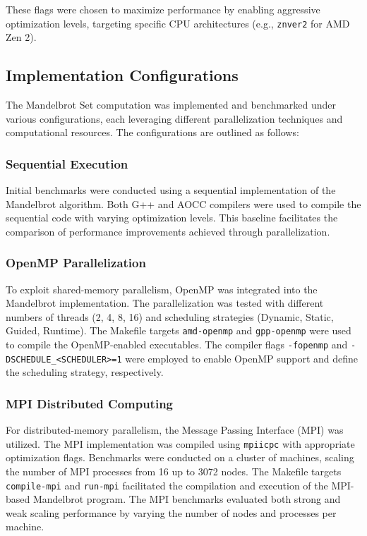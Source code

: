 \documentclass[
	report, %
	11pt, %
]{CSUniSchoolLabReport}
\newcounter{ct}
\begin{document}
These flags were chosen to maximize performance by enabling aggressive optimization levels, targeting specific CPU architectures (e.g., \texttt{znver2} for AMD Zen 2).

\subsection{Implementation Configurations}

The Mandelbrot Set computation was implemented and benchmarked under various configurations, each leveraging different parallelization techniques and computational resources. The configurations are outlined as follows:

\subsubsection{Sequential Execution}

Initial benchmarks were conducted using a sequential implementation of the Mandelbrot algorithm. Both G++ and AOCC compilers were used to compile the sequential code with varying optimization levels. This baseline facilitates the comparison of performance improvements achieved through parallelization.

\subsubsection{OpenMP Parallelization}

To exploit shared-memory parallelism, OpenMP was integrated into the Mandelbrot implementation. The parallelization was tested with different numbers of threads (2, 4, 8, 16) and scheduling strategies (Dynamic, Static, Guided, Runtime). The Makefile targets \texttt{amd-openmp} and \texttt{gpp-openmp} were used to compile the OpenMP-enabled executables. The compiler flags \texttt{-fopenmp} and \texttt{-DSCHEDULE\_<SCHEDULER>=1} were employed to enable OpenMP support and define the scheduling strategy, respectively.

\subsubsection{MPI Distributed Computing}

For distributed-memory parallelism, the Message Passing Interface (MPI) was utilized. The MPI implementation was compiled using \texttt{mpiicpc} with appropriate optimization flags. Benchmarks were conducted on a cluster of machines, scaling the number of MPI processes from 16 up to 3072 nodes. The Makefile targets \texttt{compile-mpi} and \texttt{run-mpi} facilitated the compilation and execution of the MPI-based Mandelbrot program. The MPI benchmarks evaluated both strong and weak scaling performance by varying the number of nodes and processes per machine.
\end{document}
